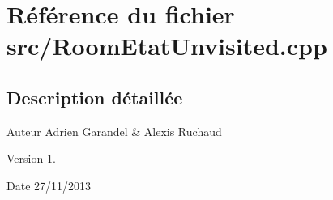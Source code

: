 \section{Référence du fichier src/\-Room\-Etat\-Unvisited.cpp}
\label{_room_etat_unvisited_8cpp}


\subsection{Description détaillée}
\begin{DoxyAuthor}{Auteur}
Adrien Garandel \& Alexis Ruchaud 
\end{DoxyAuthor}
\begin{DoxyVersion}{Version}
1. 
\end{DoxyVersion}
\begin{DoxyDate}{Date}
27/11/2013 
\end{DoxyDate}
